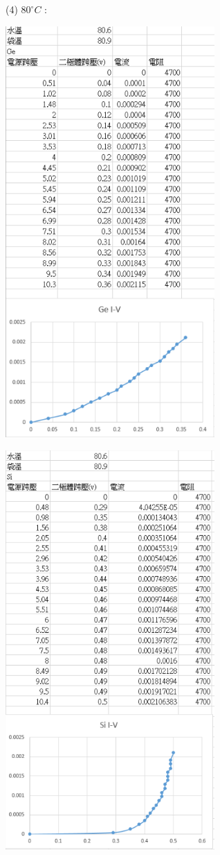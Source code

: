 \documentclass[UTF8]{ctexart}
\begin{document}
\begin{CJK*}{UTF8}{song}
(4) $80^{\circ}C$ : \\

\begin{minipage}[t]{0.48\textwidth}
\centering %
\includegraphics[width = 0.6\textwidth]{80ge.png}
\end{minipage} %
\begin{minipage}[t]{0.48\textwidth}
\centering
\includegraphics[width = 0.6\textwidth]{80si.png}

\end{minipage}
\end{CJK*}
\end{document}
